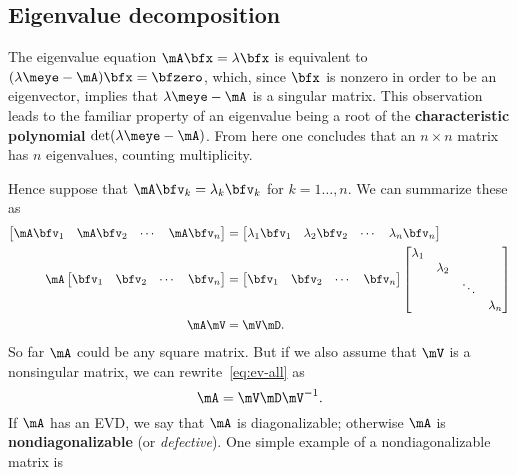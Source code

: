 \subsection{Eigenvalue decomposition}

The eigenvalue equation $\mA\bfx=\lambda\bfx$ is equivalent to $(\lambda\meye - \mA)\bfx=\bfzero$, which, since $\bfx$ is nonzero in order to be an eigenvector, implies that $\lambda\meye - \mA$ is a singular matrix. This observation leads to the familiar property of an eigenvalue being a root of the  \textbf{characteristic polynomial} $\det(\lambda \meye - \mA)$. From here one concludes that an $n\times n$ matrix has $n$ eigenvalues, counting multiplicity.

Hence suppose that $\mA\bfv_k=\lambda_k\bfv_k$ for $k=1\ldots,n$. We can summarize these as
\begin{align}
  \begin{bmatrix}
    \mA\bfv_1 & \mA\bfv_2 & \cdots & \mA\bfv_n
  \end{bmatrix}
  &=
    \begin{bmatrix}
      \lambda_1 \bfv_1 & \lambda_2\bfv_2 & \cdots & \lambda_n \bfv_n
    \end{bmatrix}\notag\\
  \mA \begin{bmatrix}
    \bfv_1 & \bfv_2 & \cdots & \bfv_n
  \end{bmatrix}
  &=
\begin{bmatrix}
    \bfv_1 & \bfv_2 & \cdots & \bfv_n
  \end{bmatrix}
  \begin{bmatrix}
    \lambda_1 & &  &  \\
    & \lambda_2 & & \\
    & & \ddots & \\
    & & & \lambda_n
  \end{bmatrix} \notag\\
  \mA \mV &= \mV \mD. \label{eq:ev-all}
\end{align}
So far $\mA$ could be any square matrix. But if we also assume that $\mV$ is a nonsingular matrix, we can rewrite~\eqref{eq:ev-all} as
\begin{equation}
  \label{eq:evdecomp}
  \mA = \mV \mD \mV^{-1}.
\end{equation}
 If $\mA$ has an EVD, we say that $\mA$ is  \gls{diagonalizable}; otherwise $\mA$ is \textbf{nondiagonalizable} (or \emph{defective}). One simple example of a nondiagonalizable matrix is
